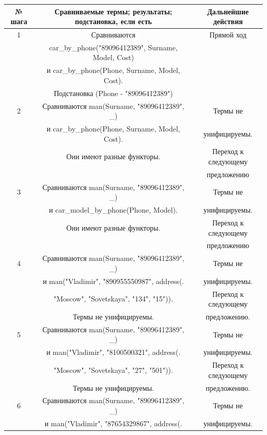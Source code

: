 \documentclass[12pt]{report}
\begin{document}
\begin{table}[H]
	\begin{center}
		\begin{tabular}{|c c c |} 
			\hline
			№ шага & Сравниваемые термы; результаты; подстановка, если есть & Дальнейшие действия \\  
			\hline
			1 & Сравниваются & Прямой ход \\
			  & car\_by\_phone("89096412389", Surname, Model, Cost) & \\
			  & и car\_by\_phone(Phone, Surname, Model, Cost).  & \\
			  & Подстановка (Phone - "89096412389") &\\
			\hline
			2 & Сравниваются man(Surname, "89096412389"{}, \_) & Термы не \\
			  & и car\_by\_phone(Phone, Surname, Model, Cost). & унифицируемы. \\
			  & Они имеют разные функторы. &Переход к следующему \\
			  & & предложению\\
			\hline
			3 & Сравниваются man(Surname, "89096412389"{}, \_) & Термы не \\
			  & и car\_model\_by\_phone(Phone, Model). & унифицируемы. \\
			  & Они имеют разные функторы. & Переход к следующему \\
			  & & предложению\\
			\hline
			4 & Сравниваются man(Surname, "89096412389"{}, \_) & Термы не \\
			  & и man("Vladimir"{}, "890955550987"{}, address(. & унифицируемы. \\
		      & "Moscow"{}, "Sovetskaya"{}, "134"{}, "15"{})).  & Переход к следующему \\
			  & Термы не унифицируемы. & предложению. \\
			\hline
		    5 & Сравниваются man(Surname, "89096412389"{}, \_) & Термы не \\
			  & и man("Vladimir"{}, "8100500321"{}, address(. & унифицируемы. \\
			  & "Moscow"{}, "Sovetskaya"{}, "27"{}, "501"{})).  & Переход к следующему \\
			  & Термы не унифицируемы. & предложению. \\
			\hline
			6 & Сравниваются man(Surname, "89096412389"{}, \_) & Термы не \\
		      & и man("Vladimir"{}, "87654329867"{}, address(. & унифицируемы. \\

\end{tabular}
\end{center}
\end{table}
\end{document}
